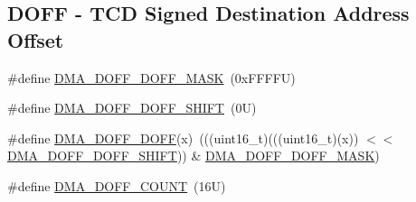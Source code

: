 \subsection*{D\+O\+FF -\/ T\+CD Signed Destination Address Offset}
\begin{DoxyCompactItemize}
\item 
\#define \mbox{\hyperlink{group___d_m_a___register___masks_gac1132370cf369d1591e78a45fca94abc}{D\+M\+A\+\_\+\+D\+O\+F\+F\+\_\+\+D\+O\+F\+F\+\_\+\+M\+A\+SK}}~(0x\+F\+F\+F\+F\+U)
\item 
\#define \mbox{\hyperlink{group___d_m_a___register___masks_gaeef657c3fd58c5d70e0d4934da146eb2}{D\+M\+A\+\_\+\+D\+O\+F\+F\+\_\+\+D\+O\+F\+F\+\_\+\+S\+H\+I\+FT}}~(0\+U)
\item 
\#define \mbox{\hyperlink{group___d_m_a___register___masks_ga7265c52e974590b80f54802562c12b40}{D\+M\+A\+\_\+\+D\+O\+F\+F\+\_\+\+D\+O\+FF}}(x)~(((uint16\+\_\+t)(((uint16\+\_\+t)(x)) $<$$<$ \mbox{\hyperlink{group___d_m_a___register___masks_gaeef657c3fd58c5d70e0d4934da146eb2}{D\+M\+A\+\_\+\+D\+O\+F\+F\+\_\+\+D\+O\+F\+F\+\_\+\+S\+H\+I\+FT}})) \& \mbox{\hyperlink{group___d_m_a___register___masks_gac1132370cf369d1591e78a45fca94abc}{D\+M\+A\+\_\+\+D\+O\+F\+F\+\_\+\+D\+O\+F\+F\+\_\+\+M\+A\+SK}})
\item 
\#define \mbox{\hyperlink{group___d_m_a___register___masks_ga50734802e69cadb6234e3bc209d19328}{D\+M\+A\+\_\+\+D\+O\+F\+F\+\_\+\+C\+O\+U\+NT}}~(16\+U)
\end{DoxyCompactItemize}
